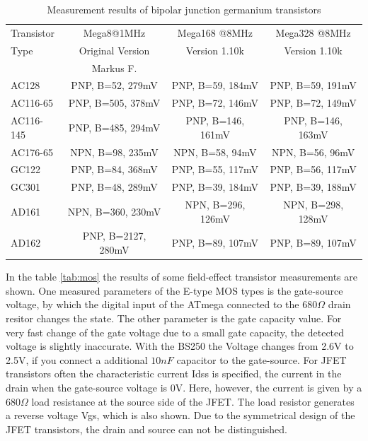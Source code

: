 \begin{table}[H]
  \begin{center}
    \begin{tabular}{| l | c | c | c |}
    \hline
 Transistor & Mega8@1MHz          & Mega168 @8MHz       & Mega328 @8MHz    \\
    Type    & Original Version    & Version 1.10k       & Version 1.10k  \\
            & Markus F.           &                     &        \\
    \hline
    \hline
AC128       & PNP, B=52, 279mV    & PNP, B=59, 184mV    & PNP, B=59, 191mV    \\
    \hline
AC116-65    & PNP, B=505, 378mV   & PNP, B=72, 146mV    & PNP, B=72, 149mV    \\
    \hline
AC116-145   & PNP, B=485, 294mV   & PNP, B=146, 161mV    & PNP, B=146, 163mV   \\
    \hline
AC176-65    & NPN, B=98, 235mV    & NPN, B=58, 94mV    & NPN, B=56, 96mV     \\
    \hline
GC122       & PNP, B=84, 368mV    & PNP, B=55, 117mV    & PNP, B=56, 117mV    \\
    \hline
GC301       & PNP, B=48, 289mV    & PNP, B=39, 184mV    & PNP, B=39, 188mV    \\
    \hline
AD161       & NPN, B=360, 230mV   & NPN, B=296, 126mV   & NPN, B=298, 128mV    \\
    \hline
AD162       & PNP, B=2127, 280mV  & PNP, B=89, 107mV    & PNP, B=89, 107mV    \\
    \hline
    \end{tabular}
  \end{center}
  \caption{Measurement results of bipolar junction germanium transistors}
  \label{tab:germanium}
\end{table}

In the table \ref{tab:mos} the results of some field-effect transistor measurements are shown.
One measured parameters of the E-type MOS types is the gate-source voltage, by which the
digital input of the ATmega connected to the \(680\Omega\) drain resitor
changes the state.
The other parameter is the gate capacity value.
For very fast change of the gate voltage due to a small gate capacity, the detected voltage is
slightly inaccurate.
With the BS250 the Voltage changes from 2.6V to 2.5V, if you connect a additional
\(10nF\) capacitor to the gate-source.
For JFET transistors often the characteristic current Idss is specified,
the current in the drain when the gate-source voltage is 0V.
Here, however, the current is given by a \(680\Omega\) load resistance at the source side
of the JFET.
The load resistor generates a reverse voltage Vgs,
which is also shown.
Due to the symmetrical design of the JFET transistors, the drain and source can not be distinguished.


